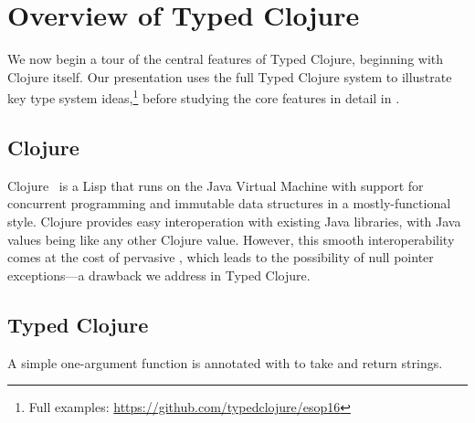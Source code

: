 \chapter{Overview of Typed Clojure}

\label{sec:overview}

We now begin a tour of the central features of Typed Clojure,
beginning with Clojure itself. Our presentation
uses the full Typed Clojure system to illustrate key type system
ideas,\footnote{Full examples: \url{https://github.com/typedclojure/esop16}} before studying the core features in detail in
.

\section{Clojure}

Clojure~\cite{Hic08} is a Lisp that runs on the
Java Virtual Machine with support for concurrent programming
and immutable data structures in a mostly-functional
style.
%
Clojure provides easy interoperation with existing Java libraries, with Java values being like any other Clojure value. 
However, this smooth interoperability comes at the cost of pervasive , which leads to the possibility of null pointer exceptions---a drawback we address in Typed Clojure.

%
%
%

\section{Typed Clojure}

A simple one-argument function  is annotated with  to take and return strings.

